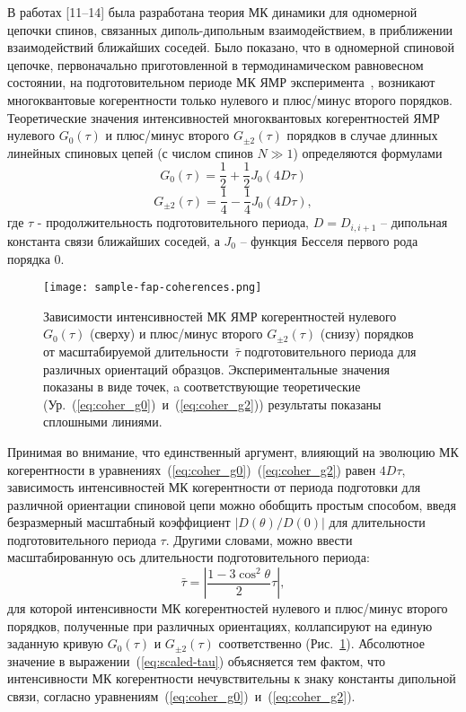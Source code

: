 В работах [11–14] была разработана теория МК динамики для одномерной цепочки спинов,
связанных диполь-дипольным взаимодействием,
в приближении взаимодействий ближайших соседей.
Было показано,
что в одномерной спиновой цепочке,
первоначально приготовленной в термодинамическом равновесном состоянии,
на подготовительном периоде МК ЯМР эксперимента~\cite{Baum1985},
возникают многоквантовые когерентности только нулевого и плюс/минус второго порядков.
%
Теоретические значения интенсивностей многоквантовых когерентностей ЯМР нулевого $G_0(\tau)$ и плюс/минус второго $G_{\pm2}(\tau)$ порядков
в случае длинных линейных спиновых цепей (с числом спинов $N \gg 1$) определяются формулами
%
\begin{equation}
    \label{eq:coher_g0}
    G_{0}(\tau) = \frac 1 2 + \frac 1 2 J_{0}(4D\tau)
\end{equation}
%
\begin{equation}
    \label{eq:coher_g2}
    G_{\pm2}(\tau) = \frac 1 4 - \frac 1 4 J_{0}(4D\tau),
\end{equation}
где $\tau$ - продолжительность подготовительного периода,
$D = D_{i, i+1}$ – дипольная константа связи ближайших соседей,
а $J_0$ – функция Бесселя первого рода порядка 0.

\begin{figure}[H]
  \centering
  \texttt{[image: sample-fap-coherences.png]}
  \caption{
    Зависимости интенсивностей МК ЯМР когерентностей нулевого $G_0(\tau)$ (сверху) и плюс/минус второго $G_{\pm2}(\tau)$ (снизу) порядков
    от масштабируемой длительности~$\bar\tau$ подготовительного периода для различных ориентаций образцов.
    Экспериментальные значения показаны в виде точек,
    a соответствующие теоретические (Ур.~(\ref{eq:coher_g0})~и~(\ref{eq:coher_g2})) результаты показаны сплошными линиями.
  }
  \label{fig:sample-fap-coherences}
\end{figure}

Принимая во внимание, что единственный аргумент, влияющий на эволюцию МК когерентности в уравнениях~(\ref{eq:coher_g0})~(\ref{eq:coher_g2}) равен $4D\tau$,
зависимость интенсивностей МК когерентности от периода подготовки для различной ориентации спиновой цепи можно обобщить простым способом\cite{Bochkin2019jmr},
введя безразмерный масштабный коэффициент $|D(\theta)/D (0)|$ для длительности подготовительного периода $\tau$.
Другими словами, можно ввести масштабированную ось длительности подготовительного периода:
%
\begin{equation}\label{eq:scaled-tau}
 \bar\tau = \left| \dfrac{1 - 3\cos^2{\theta}}{2} \tau \right|,
\end{equation}
%
для которой интенсивности МК когерентностей нулевого и плюс/минус второго порядков,
полученные при различных ориентациях,
коллапсируют на единую заданную кривую $G_0(\tau)$ и $G_{\pm 2}(\tau)$ соответственно (Рис.~\ref{fig:sample-fap-coherences}).
Абсолютное значение в выражении~(\ref{eq:scaled-tau}) объясняется тем фактом,
что интенсивности МК когерентности нечувствительны к знаку константы дипольной связи,
согласно уравнениям~(\ref{eq:coher_g0})~и~(\ref{eq:coher_g2}).

